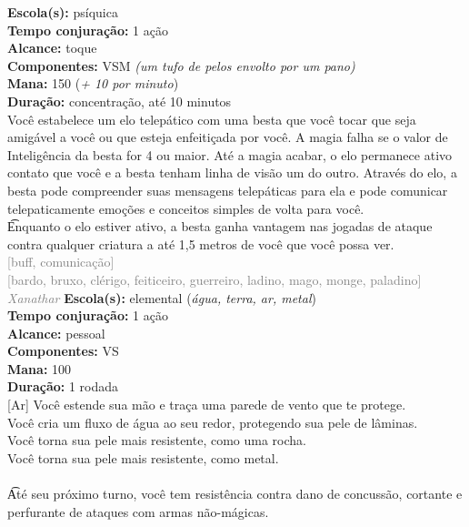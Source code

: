 \documentclass{RPG_Adventure}[2021/10/20]
\begin{document}
{\small \t \textbf{Escola(s):} psíquica\\\t \textbf{Tempo conjuração:} 1 ação\\\t \textbf{Alcance:} toque\\\t \textbf{Componentes:} VSM \textit{(um tufo de pelos envolto por um pano)}\\\t \textbf{Mana:} 150 (\textit{+ 10 por minuto})\\\t \textbf{Duração:} concentração, até 10 minutos\\}
{\normalsize Você estabelece um elo telepático com uma besta que você tocar que seja amigável a você ou que esteja enfeitiçada por você. A magia falha se o valor de Inteligência da besta for 4 ou maior. Até a magia acabar, o elo permanece ativo contato que você e a besta tenham linha de visão um do outro. Através do elo, a besta pode compreender suas mensagens telepáticas para ela e pode comunicar telepaticamente emoções e conceitos simples de volta para você.\\\t Enquanto o elo estiver ativo, a besta ganha vantagem nas jogadas de ataque contra qualquer criatura a até 1,5 metros de você que você possa ver.\\}
{\scriptsize \textcolor{gray}{[buff, comunicação]\\}}
{\scriptsize \textcolor{gray}{[bardo, bruxo, clérigo, feiticeiro, guerreiro, ladino, mago, monge, paladino]\\}}
{\tiny \textcolor{gray}{\textit{Xanathar}}}
{\small \t \textbf{Escola(s):} elemental (\textit{água, terra, ar, metal})\\\t \textbf{Tempo conjuração:} 1 ação\\\t \textbf{Alcance:} pessoal\\\t \textbf{Componentes:} VS\\\t \textbf{Mana:} 100\\\t \textbf{Duração:} 1 rodada\\}
{\normalsize [Ar] Você estende sua mão e traça uma parede de vento que te protege.\\[Água] Você cria um fluxo de água ao seu redor, protegendo sua pele de lâminas.\\[Terra] Você torna sua pele mais resistente, como uma rocha.\\[Metal] Você torna sua pele mais resistente, como metal.\\\\\t Até seu próximo turno, você tem resistência contra dano de concussão, cortante e perfurante de ataques com armas não-mágicas.\\}
\end{document}
